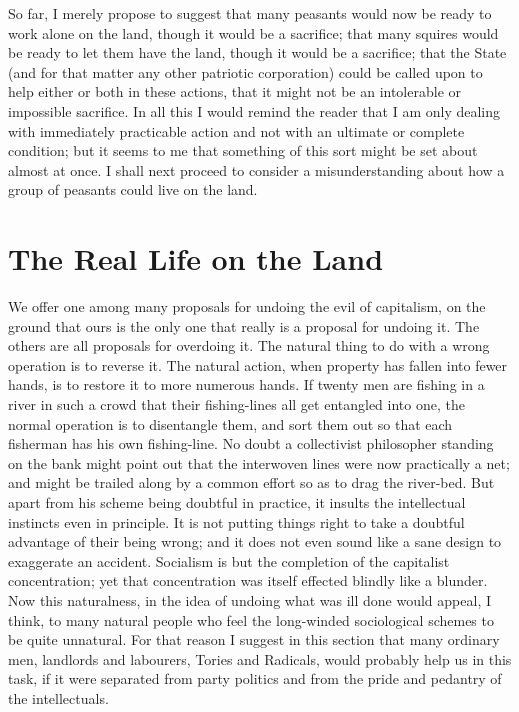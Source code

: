 \documentclass{book}
\begin{document}
So far, I merely propose to suggest that many peasants would now be ready to work alone on the land, though it would be a sacrifice; that many squires would be ready to let them have the land, though it would be a sacrifice; that the State (and for that matter any other patriotic corporation) could be called upon to help either or both in these actions, that it might not be an intolerable or impossible sacrifice. In all this I would remind the reader that I am only dealing with immediately practicable action and not with an ultimate or complete condition; but it seems to me that something of this sort might be set about almost at once. I shall next proceed to consider a misunderstanding about how a group of peasants could live on the land.

\chapter{The Real Life on the Land}
\label{chapter-13}
We offer one among many proposals for undoing the evil of capitalism, on the ground that ours is the only one that really is a proposal for undoing it. The others are all proposals for overdoing it. The natural thing to do with a wrong operation is to reverse it. The natural action, when property has fallen into fewer hands, is to restore it to more numerous hands. If twenty men are fishing in a river in such a crowd that their fishing-lines all get entangled into one, the normal operation is to disentangle them, and sort them out so that each fisherman has his own fishing-line. No doubt a collectivist philosopher standing on the bank might point out that the interwoven lines were now practically a net; and might be trailed along by a common effort so as to drag the river-bed. But apart from his scheme being doubtful in practice, it insults the intellectual instincts even in principle. It is not putting things right to take a doubtful advantage of their being wrong; and it does not even sound like a sane design to exaggerate an accident. Socialism is but the completion of the capitalist concentration; yet that concentration was itself effected blindly like a blunder. Now this naturalness, in the idea of undoing what was ill done would appeal, I think, to many natural people who feel the long-winded sociological schemes to be quite unnatural. For that reason I suggest in this section that many ordinary men, landlords and labourers, Tories and Radicals, would probably help us in this task, if it were separated from party politics and from the pride and pedantry of the intellectuals.
\end{document}
